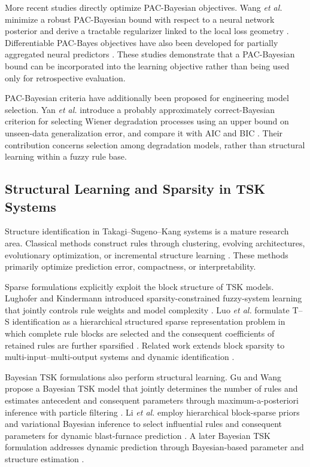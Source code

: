More recent studies directly optimize PAC-Bayesian objectives. Wang \emph{et al.} minimize a robust PAC-Bayesian bound with respect to a neural
network posterior and derive a tractable regularizer linked to the local loss geometry \cite{wang2023direct}. Differentiable PAC-Bayes objectives have also
been developed for partially aggregated neural predictors \cite{biggs2021differentiable}. These studies demonstrate that a PAC-Bayesian
bound can be incorporated into the learning objective rather than being used only for retrospective evaluation.

PAC-Bayesian criteria have additionally been proposed for engineering model selection. Yan \emph{et al.} introduce a probably approximately
correct-Bayesian criterion for selecting Wiener degradation processes using an upper bound on unseen-data generalization error, and compare it with AIC and
BIC \cite{yan2026pbc}. Their contribution concerns selection among degradation models, rather than structural learning within a fuzzy rule base.

\subsection{Structural Learning and Sparsity in TSK Systems}

Structure identification in Takagi--Sugeno--Kang systems is a mature research area. Classical methods construct rules through clustering, evolving
architectures, evolutionary optimization, or incremental structure learning \cite{Chiu1994Cluster,angelov2004online}. These methods primarily optimize
prediction error, compactness, or interpretability.

Sparse formulations explicitly exploit the block structure of TSK models.
Lughofer and Kindermann introduced sparsity-constrained fuzzy-system learning that jointly controls rule weights and model complexity  \cite{lughofer2010sparsefis}. Luo \emph{et al.} formulate T--S identification as a hierarchical structured sparse representation problem in which complete
rule blocks are selected and the consequent coefficients of retained rules are further sparsified \cite{luo2013hierarchical}. Related work extends block
sparsity to multi-input--multi-output systems and dynamic identification \cite{luo2014joint,luo2015dynamic}.

Bayesian TSK formulations also perform structural learning. Gu and Wang propose a Bayesian TSK model that jointly determines the number of rules and estimates antecedent and consequent parameters through maximum-a-posteriori inference with particle filtering \cite{gu2018btsk}. Li \emph{et al.} employ hierarchical block-sparse priors and variational Bayesian inference to select influential rules and consequent parameters for dynamic blast-furnace prediction \cite{li2018blocksparse}. A later Bayesian TSK formulation addresses dynamic prediction through Bayesian-based parameter and structure estimation \cite{li2022bayesiants}.

